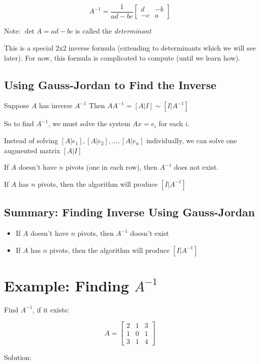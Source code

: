 \documentclass[12pt,a4paper]{article}
\begin{document}
\[A^{-1} = \frac{1}{ad-bc} \begin{bmatrix} d & -b \\ -c & a \end{bmatrix}\]

Note: $\det A = ad-bc$ is called the \textit{determinant}

This is a special 2x2 inverse formula (extending to determinants which we will see later). For now, this formula is complicated to compute (until we learn how).

\subsection{Using Gauss-Jordan to Find the Inverse}

Suppose $A$ has inverse $A^{-1}$
Then $AA^{-1} = [A|I] \sim [I|A^{-1}]$

So to find $A^{-1}$, we must solve the system $Ax = e_i$ for each $i$.

Instead of solving $[A|e_1], [A|e_2], \ldots, [A|e_n]$ individually, we can solve one augmented matrix $[A|I]$

If $A$ doesn't have $n$ pivots (one in each row), then $A^{-1}$ does not exist.

If $A$ has $n$ pivots, then the algorithm will produce $[I|A^{-1}]$

\subsection{Summary: Finding Inverse Using Gauss-Jordan}
\begin{itemize}
    \item If $A$ doesn't have $n$ pivots, then $A^{-1}$ doesn't exist
    \item If $A$ has $n$ pivots, then the algorithm will produce $[I|A^{-1}]$
\end{itemize}

\section{Example: Finding $A^{-1}$}

Find $A^{-1}$, if it exists:

\[A = \begin{bmatrix} 2 & 1 & 3 \\ 1 & 0 & 1 \\ 3 & 1 & 4 \end{bmatrix}\]

Solution:
\end{document}
